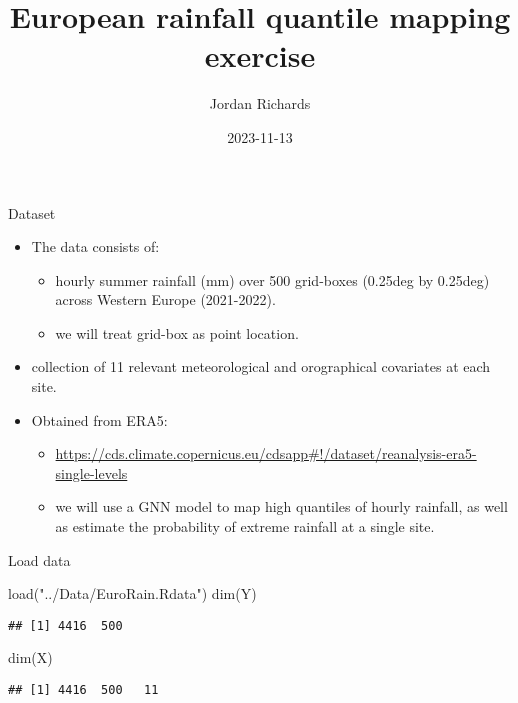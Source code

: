 \documentclass[
  ignorenonframetext,
]{beamer}
\title{European rainfall quantile mapping exercise}
\author{Jordan Richards}
\date{2023-11-13}
\newenvironment{Shaded}{\begin{snugshade}}{\end{snugshade}}
\newcommand{\FunctionTok}[1]{\textcolor[rgb]{0.00,0.00,0.00}{#1}}
\newcommand{\NormalTok}[1]{#1}
\newcommand{\StringTok}[1]{\textcolor[rgb]{0.31,0.60,0.02}{#1}}
\providecommand{\tightlist}{%
  \setlength{\itemsep}{0pt}\setlength{\parskip}{0pt}}
\begin{document}
\frame{\titlepage}

\begin{frame}{Dataset}
\protect\hypertarget{dataset}{}
\begin{itemize}
\tightlist
\item
  The data consists of:

  \begin{itemize}
  \tightlist
  \item
    hourly summer rainfall (mm) over 500 grid-boxes (0.25deg by 0.25deg)
    across Western Europe (2021-2022).
  \item
    we will treat grid-box as point location.
  \end{itemize}
\item
  collection of 11 relevant meteorological and orographical covariates
  at each site.
\item
  Obtained from ERA5:

  \begin{itemize}
  \tightlist
  \item
    \url{https://cds.climate.copernicus.eu/cdsapp\#!/dataset/reanalysis-era5-single-levels}
  \item
    we will use a GNN model to map high quantiles of hourly rainfall, as
    well as estimate the probability of extreme rainfall at a single
    site.
  \end{itemize}
\end{itemize}
\end{frame}

\begin{frame}[fragile]{Load data}
\protect\hypertarget{load-data}{}
\begin{Shaded}
\begin{Highlighting}[]
\FunctionTok{load}\NormalTok{(}\StringTok{"../Data/EuroRain.Rdata"}\NormalTok{)}
\FunctionTok{dim}\NormalTok{(Y)}
\end{Highlighting}
\end{Shaded}

\begin{verbatim}
## [1] 4416  500
\end{verbatim}

\begin{Shaded}
\begin{Highlighting}[]
\FunctionTok{dim}\NormalTok{(X)}
\end{Highlighting}
\end{Shaded}

\begin{verbatim}
## [1] 4416  500   11
\end{verbatim}
\end{frame}
\end{document}
